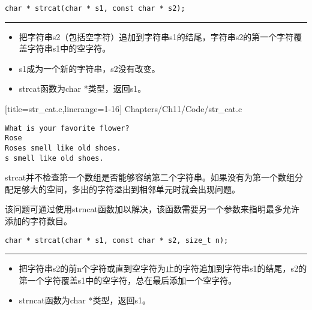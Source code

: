 \begin{frame}[fragile] 
\begin{lstlisting}[title=strcat函数原型, basicstyle=\ttfamily]
char * strcat(char * s1, const char * s2);
\end{lstlisting}
\rule{\textwidth}{0.3mm} \vspace{0.3mm}

\begin{itemize}
\item
{}把字符串s2（包括空字符）追加到字符串s1的结尾，字符串s2的第一个字符覆盖字符串s1中的空字符。\\[0.1in]
\item
s1成为一个新的字符串，s2没有改变。\\[0.1in]
\item 
strcat函数为char *类型，返回s1。
\end{itemize}
\end{frame}

\begin{frame}[fragile]

[title=str\_cat.c,linerange={1-16}]
{Chapters/Ch11/Code/str_cat.c}
\end{frame}

\begin{frame}[fragile]
\begin{lstlisting}[basicstyle=\ttfamily]
What is your favorite flower?
Rose
Roses smell like old shoes.
s smell like old shoes.
\end{lstlisting}
\end{frame}

\begin{frame}[fragile] 
strcat并不检查第一个数组是否能够容纳第二个字符串。如果没有为第一个数组分配足够大的空间，多出的字符溢出到相邻单元时就会出现问题。\vspace{.1in}

该问题可通过使用strncat函数加以解决，该函数需要另一个参数来指明最多允许添加的字符数目。


\end{frame}

\begin{frame}[fragile]
\begin{lstlisting}[title=strncat函数原型, basicstyle=\ttfamily]
char * strcat(char * s1, const char * s2, size_t n);
\end{lstlisting}
\rule{\textwidth}{0.3mm} \vspace{0.3mm}

\begin{itemize}
\item 
{}把字符串s2的前n个字符或直到空字符为止的字符追加到字符串s1的结尾，s2的第一个字符覆盖s1中的空字符，总在最后添加一个空字符。\\[0.1in]
\item
strncat函数为char *类型，返回s1。
\end{itemize}
\end{frame}

